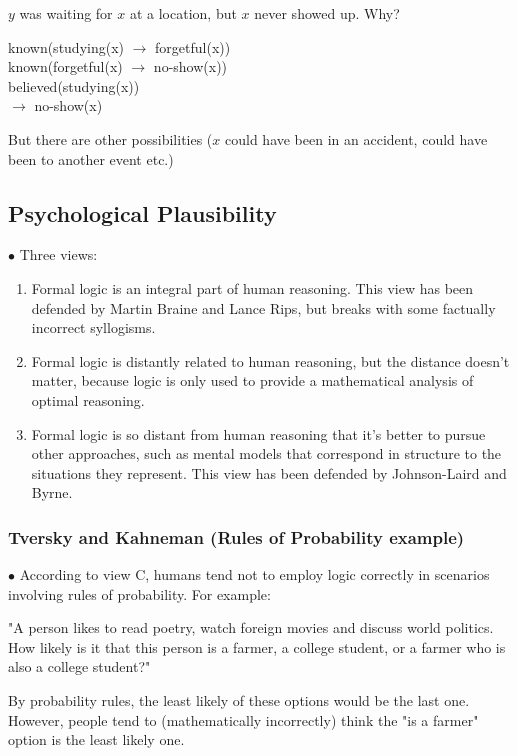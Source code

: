\documentclass[english,openany]{book}
\begin{document}
$y$ was waiting for $x$ at a location, but $x$ never showed up. Why?

known(studying(x) $\rightarrow$ forgetful(x))\\
known(forgetful(x) $\rightarrow$ no-show(x))\\
believed(studying(x))\\
$\rightarrow$ no-show(x)

But there are other possibilities ($x$ could have been in an accident, could have been to another event etc.)


\subsection{Psychological Plausibility}

$\bullet$ Three views:

\begin{enumerate}[label=(\Alph*)]
    \item Formal logic is an integral part of human reasoning. This view has been defended by Martin Braine and Lance Rips, but breaks with some factually incorrect syllogisms.
    \item Formal logic is distantly related to human reasoning, but the distance doesn't matter, because logic is only used to provide a mathematical analysis of optimal reasoning.
    \item Formal logic is so distant from human reasoning that it's better to pursue other approaches, such as mental models that correspond in structure to the situations they represent. This view has been defended by Johnson-Laird and Byrne.
\end{enumerate}

\subsubsection{Tversky and Kahneman (Rules of Probability example)}

$\bullet$ According to view C, humans tend not to employ logic correctly in scenarios involving rules of probability. For example:

"A person likes to read poetry, watch foreign movies and discuss world politics. How likely is it that this person is a farmer, a college student, or a farmer who is also a college student?"

By probability rules, the least likely of these options would be the last one. However, people tend to (mathematically incorrectly) think the "is a farmer" option is the least likely one.
\end{document}
